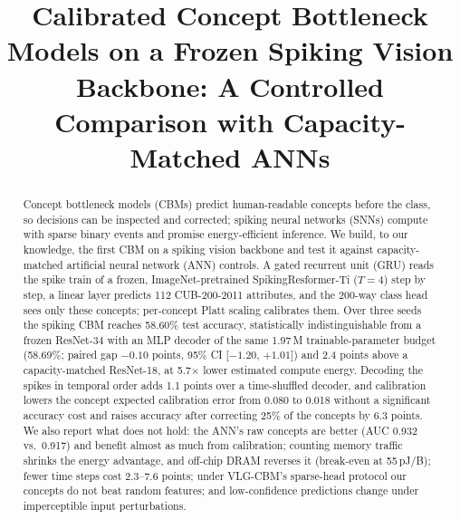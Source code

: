 \documentclass[conference]{IEEEtran}
\begin{document}
\title{Calibrated Concept Bottleneck Models on a Frozen Spiking Vision Backbone: A Controlled Comparison with Capacity-Matched ANNs}

\author{
\and
{}
\and
{}
\and
{}
}

\maketitle

\begin{abstract}
Concept bottleneck models (CBMs) predict human-readable concepts before the class, so decisions can be inspected and corrected; spiking neural networks (SNNs) compute with sparse binary events and promise energy-efficient inference. We build, to our knowledge, the first CBM on a spiking vision backbone and test it against capacity-matched artificial neural network (ANN) controls. A gated recurrent unit (GRU) reads the spike train of a frozen, ImageNet-pretrained SpikingResformer-Ti ($T=4$) step by step, a linear layer predicts 112 CUB-200-2011 attributes, and the 200-way class head sees only these concepts; per-concept Platt scaling calibrates them. Over three seeds the spiking CBM reaches 58.60\% test accuracy, statistically indistinguishable from a frozen ResNet-34 with an MLP decoder of the same 1.97\,M trainable-parameter budget (58.69\%; paired gap $-0.10$ points, 95\% CI [$-1.20$, $+1.01$]) and 2.4 points above a capacity-matched ResNet-18, at 5.7$\times$ lower estimated compute energy. Decoding the spikes in temporal order adds 1.1 points over a time-shuffled decoder, and calibration lowers the concept expected calibration error from 0.080 to 0.018 without a significant accuracy cost and raises accuracy after correcting 25\% of the concepts by 6.3 points. We also report what does not hold: the ANN's raw concepts are better (AUC 0.932 vs.\ 0.917) and benefit almost as much from calibration; counting memory traffic shrinks the energy advantage, and off-chip DRAM reverses it (break-even at 55\,pJ/B); fewer time steps cost 2.3--7.6 points; under VLG-CBM's sparse-head protocol our concepts do not beat random features; and low-confidence predictions change under imperceptible input perturbations.
\end{abstract}
\end{document}
